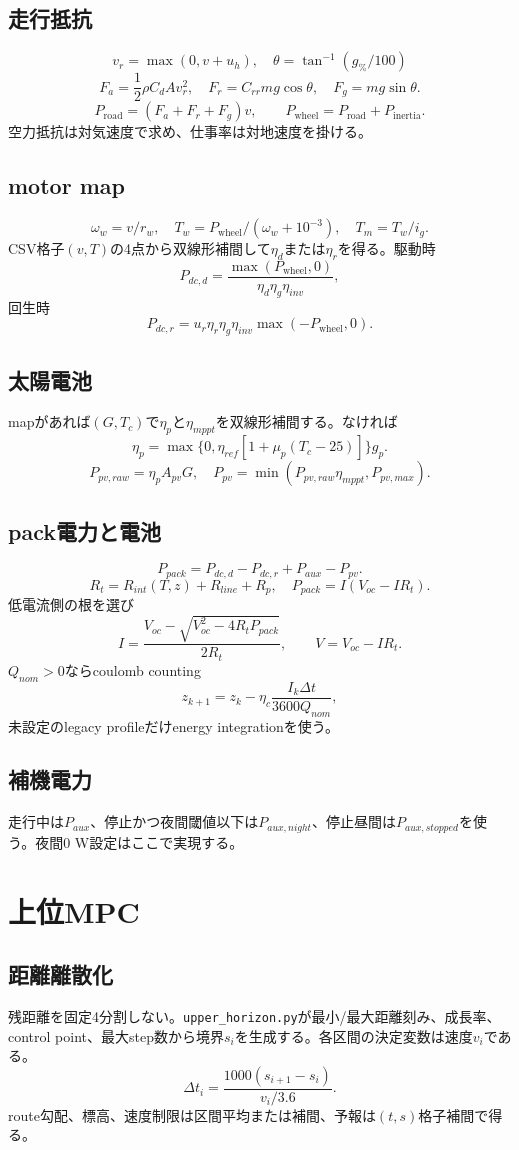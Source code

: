 \documentclass[a4paper,10pt,oneside]{book}
\begin{document}
\section{走行抵抗}
\[
v_r=\max(0,v+u_h),\quad \theta=\tan^{-1}(g_{\%}/100)
\]
\[
F_a=\frac12\rho C_dA v_r^2,\quad
F_r=C_{rr}mg\cos\theta,\quad
F_g=mg\sin\theta.
\]
\[
P_{\mathrm{road}}=(F_a+F_r+F_g)v,\qquad
P_{\mathrm{wheel}}=P_{\mathrm{road}}+P_{\mathrm{inertia}}.
\]
空力抵抗は対気速度で求め、仕事率は対地速度を掛ける。

\section{motor map}
\[
\omega_w=v/r_w,\quad T_w=P_{\mathrm{wheel}}/(\omega_w+10^{-3}),
\quad T_m=T_w/i_g.
\]
CSV格子$(v,T)$の4点から双線形補間して$\eta_d$または$\eta_r$を得る。駆動時
\[
P_{dc,d}=\frac{\max(P_{\mathrm{wheel}},0)}{\eta_d\eta_g\eta_{inv}},
\]
回生時
\[
P_{dc,r}=u_r\eta_r\eta_g\eta_{inv}\max(-P_{\mathrm{wheel}},0).
\]

\section{太陽電池}
mapがあれば$(G,T_c)$で$\eta_p$と$\eta_{mppt}$を双線形補間する。なければ
\[
\eta_p=\max\{0,\eta_{ref}[1+\mu_p(T_c-25)]\}g_p.
\]
\[
P_{pv,raw}=\eta_p A_{pv}G,\quad
P_{pv}=\min(P_{pv,raw}\eta_{mppt},P_{pv,max}).
\]

\section{pack電力と電池}
\[
P_{pack}=P_{dc,d}-P_{dc,r}+P_{aux}-P_{pv}.
\]
\[
R_t=R_{int}(T,z)+R_{line}+R_p,\quad
P_{pack}=I(V_{oc}-IR_t).
\]
低電流側の根を選び
\[
I=\frac{V_{oc}-\sqrt{V_{oc}^2-4R_tP_{pack}}}{2R_t},\qquad
V=V_{oc}-IR_t.
\]
$Q_{nom}>0$ならcoulomb counting
\[
z_{k+1}=z_k-\eta_c\frac{I_k\Delta t}{3600Q_{nom}},
\]
未設定のlegacy profileだけenergy integrationを使う。

\section{補機電力}
走行中は$P_{aux}$、停止かつ夜間閾値以下は$P_{aux,night}$、停止昼間は$P_{aux,stopped}$を使う。夜間0 W設定はここで実現する。

\chapter{上位MPC}
\section{距離離散化}
残距離を固定4分割しない。\texttt{upper\_horizon.py}が最小/最大距離刻み、成長率、control point、最大step数から境界$s_i$を生成する。各区間の決定変数は速度$v_i$である。
\[
\Delta t_i=\frac{1000(s_{i+1}-s_i)}{v_i/3.6}.
\]
route勾配、標高、速度制限は区間平均または補間、予報は$(t,s)$格子補間で得る。
\end{document}
